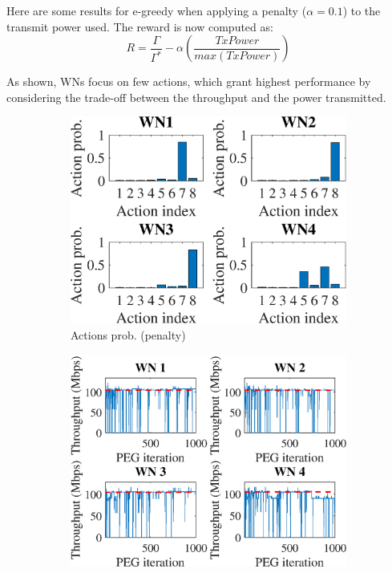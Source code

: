 \documentclass[preprint,12pt]{article}
\begin{document}
Here are some results for e-greedy when applying a penalty ($\alpha = 0.1$) to the transmit power used. The reward is now computed as:
\begin{equation}
	R = \frac{\Gamma}{\Gamma^*} - \alpha (\frac{TxPower}{max(TxPower)})
\end{equation}

As shown, WNs focus on few actions, which grant highest performance by considering the trade-off between the throughput and the power transmitted.

\begin{figure}[h!]
	\centering
	\begin{subfigure}[b]{.3\textwidth}
		\includegraphics[width=\textwidth]{images/actions_probability_PEG}
		\caption{Actions prob. (penalty)}\label{fig:actions_probability_PEG}
	\end{subfigure}	
	\begin{subfigure}[b]{.3\textwidth}
		\includegraphics[width=\textwidth]{images/temporal_individual_tpt_PEG}

\end{subfigure}
\end{figure}
\end{document}
